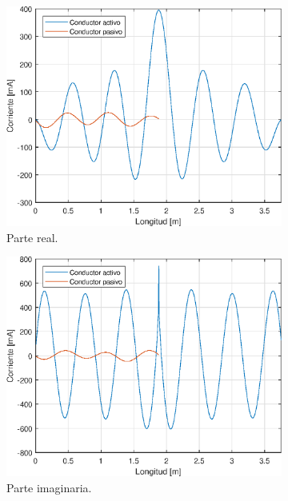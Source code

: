 \begin{figure}[H]
	\begin{subfigure}{0.5\textwidth}
		\includegraphics[scale=0.6]{imagenes/i_real_480.eps}
		\caption{Parte real.}
		\label{fig.i_real_480}	
	\end{subfigure}
	\quad
	\begin{subfigure}{0.5\textwidth}
		\includegraphics[scale=0.6]{imagenes/i_imag_480.eps}
		\caption{Parte imaginaria.}
		\label{fig.i_imag_480}
	\end{subfigure}
	\quad
	\begin{subfigure}{0.5\textwidth}

\end{subfigure}
\end{figure}
